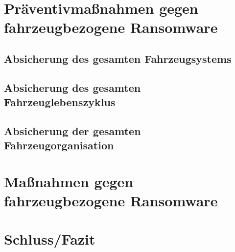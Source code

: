\documentclass[oneside, 11pt, notitlepage, a4paper, numbers=noenddot]{scrartcl}
\begin{document}
\section{Präventivmaßnahmen gegen fahrzeugbezogene Ransomware}

\subsection{Absicherung des gesamten Fahrzeugsystems}

\subsection{Absicherung des gesamten Fahrzeuglebenszyklus}

\subsection{Absicherung der gesamten Fahrzeugorganisation}

\section{Maßnahmen gegen fahrzeugbezogene Ransomware}


\section{Schluss/Fazit}




\end{document}
